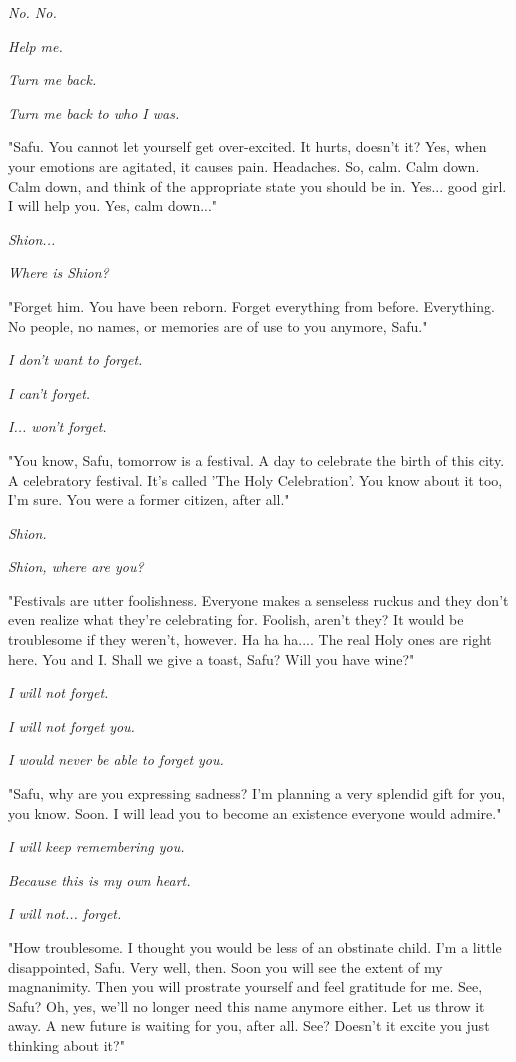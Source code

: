 \emph{No. No.}

\emph{Help me.}

\emph{Turn me back.}

\emph{Turn me back to who I was.}

"Safu. You cannot let yourself get over-excited. It hurts, doesn't it?
Yes, when your emotions are agitated, it causes pain. Headaches. So,
calm. Calm down. Calm down, and think of the appropriate state you
should be in. Yes... good girl. I will help you. Yes, calm down..."

\emph{Shion...}

\emph{Where is Shion?}

"Forget him. You have been reborn. Forget everything from before.
Everything. No people, no names, or memories are of use to you anymore,
Safu."

\emph{I don't want to forget.}

\emph{I can't forget.}

\emph{I... won't forget.}

"You know, Safu, tomorrow is a festival. A day to celebrate the birth of
this city. A celebratory festival. It's called 'The Holy Celebration'.
You know about it too, I'm sure. You were a former citizen, after all."

\emph{Shion.}

\emph{Shion, where are you?}

"Festivals are utter foolishness. Everyone makes a senseless ruckus and
they don't even realize what they're celebrating for. Foolish, aren't
they? It would be troublesome if they weren't, however. Ha ha ha.... The
real Holy ones are right here. You and I. Shall we give a toast, Safu?
Will you have wine?"

\emph{I will not forget.}

\emph{I will not forget you.}

\emph{I would never be able to forget you.}

"Safu, why are you expressing sadness? I'm planning a very splendid gift
for you, you know. Soon. I will lead you to become an existence everyone
would admire."

\emph{I will keep remembering you.}

\emph{Because this is my own heart.}

\emph{I will not... forget.}

"How troublesome. I thought you would be less of an obstinate child. I'm
a little disappointed, Safu. Very well, then. Soon you will see the
extent of my magnanimity. Then you will prostrate yourself and feel
gratitude for me. See, Safu? Oh, yes, we'll no longer need this name
anymore either. Let us throw it away. A new future is waiting for you,
after all. See? Doesn't it excite you just thinking about it?"

